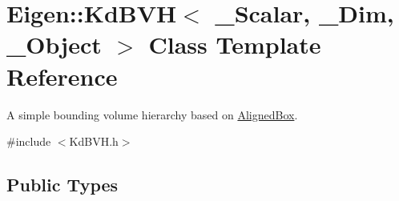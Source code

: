 \hypertarget{class_eigen_1_1_kd_b_v_h}{}\section{Eigen\+:\+:Kd\+B\+VH$<$ \+\_\+\+Scalar, \+\_\+\+Dim, \+\_\+\+Object $>$ Class Template Reference}
\label{class_eigen_1_1_kd_b_v_h}


A simple bounding volume hierarchy based on \hyperlink{group___geometry___module_class_eigen_1_1_aligned_box}{Aligned\+Box}.  




{\ttfamily \#include $<$Kd\+B\+V\+H.\+h$>$}

\subsection*{Public Types}
